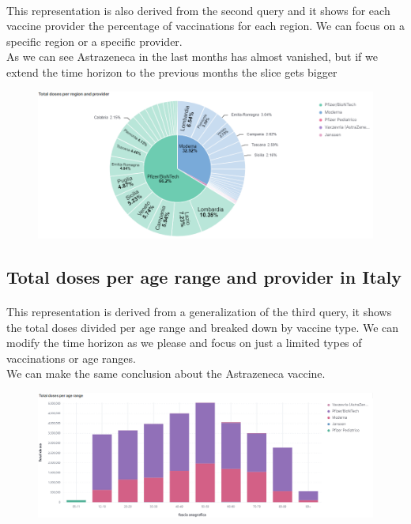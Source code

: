 \documentclass[a4paper,12pt]{article}
\begin{document}
\paragraph{}This representation is also derived from the second query and it shows for each vaccine provider the percentage of vaccinations for each region. We can focus on a specific region or a specific provider.\\
As we can see Astrazeneca in the last months has almost vanished, but if we extend the time horizon to the previous months the slice gets bigger
\begin{figure}[h]
	\centering
  \includegraphics[width=\linewidth]{dashboards/dash2.png}
\end{figure}

\subsection{Total doses per age range and provider in Italy}

\paragraph{}This representation is derived from a generalization of the third query, it shows the total doses divided per age range and breaked down by vaccine type.
We can modify the time horizon as we please and focus on just a limited types of vaccinations or age ranges.\\
We can make the same conclusion about the Astrazeneca vaccine.
\begin{figure}[h]
	\centering
  \includegraphics[width=\linewidth]{dashboards/dash3.png}
\end{figure}
\end{document}
